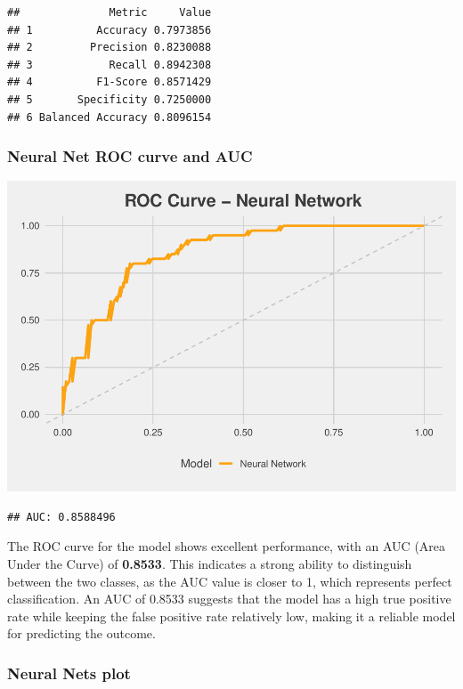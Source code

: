 \documentclass[
]{article}
\begin{document}
\begin{verbatim}
##              Metric     Value
## 1          Accuracy 0.7973856
## 2         Precision 0.8230088
## 3            Recall 0.8942308
## 4          F1-Score 0.8571429
## 5       Specificity 0.7250000
## 6 Balanced Accuracy 0.8096154
\end{verbatim}

\subsubsection{Neural Net ROC curve and
AUC}\label{neural-net-roc-curve-and-auc}

\begin{center}\includegraphics{Diabetes-Project_files/figure-latex/nn roc and auc-1} \end{center}

\begin{verbatim}
## AUC: 0.8588496
\end{verbatim}

The ROC curve for the model shows excellent performance, with an AUC
(Area Under the Curve) of \textbf{0.8533}. This indicates a strong
ability to distinguish between the two classes, as the AUC value is
closer to 1, which represents perfect classification. An AUC of 0.8533
suggests that the model has a high true positive rate while keeping the
false positive rate relatively low, making it a reliable model for
predicting the outcome.

\newpage

\subsubsection{Neural Nets plot}\label{neural-nets-plot}
\end{document}
